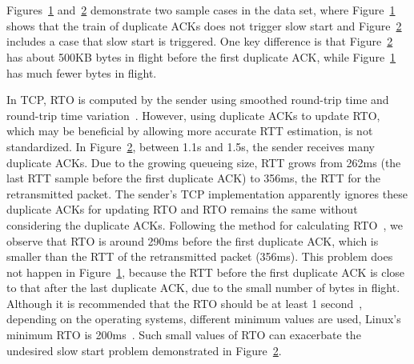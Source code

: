 \begin{figure}[t]
\centering
{}\\
\label{fig:seq.ack1}
\end{figure}

\begin{figure}[t]
\centering
{}\\
\label{fig:seq.ack2}
\end{figure}

Figures~\ref{fig:seq.ack1} and~\ref{fig:seq.ack2} demonstrate two sample cases in the data set, where Figure~\ref{fig:seq.ack1} shows that the train of duplicate ACKs does not trigger slow start and Figure~\ref{fig:seq.ack2} includes a case that slow start is triggered. One key difference is that Figure~\ref{fig:seq.ack2} has about 500KB bytes in flight before the first duplicate ACK, while Figure~\ref{fig:seq.ack1} has much fewer bytes in flight.

In TCP, RTO is computed by the sender using smoothed round-trip time and round-trip time variation~\cite{rfc6298}. However, using duplicate ACKs to update RTO, which may be beneficial by allowing more accurate RTT estimation, is not standardized. In Figure~\ref{fig:seq.ack2}, between 1.1s and 1.5s, the sender receives many duplicate ACKs. Due to the growing queueing size, RTT grows from 262ms (the last RTT sample before the first duplicate ACK) to 356ms, the RTT for the retransmitted packet. The sender's TCP implementation apparently ignores these duplicate ACKs for updating RTO and RTO remains the same without considering the duplicate ACKs. Following the method for calculating RTO~\cite{rfc6298}, we observe that RTO is around 290ms before the first duplicate ACK, which is smaller than the RTT of the retransmitted packet (356ms). This problem does not happen in Figure~\ref{fig:seq.ack1}, because the RTT before the first duplicate ACK is close to that after the last duplicate ACK, due to the small number of bytes in flight. Although it is recommended that the RTO should be at least 1 second~\cite{rfc6298}, depending on the operating systems, different minimum values are used, \eg Linux's minimum RTO is 200ms~\cite{linuxrto}. Such small values of RTO can exacerbate the undesired slow start problem demonstrated in Figure~\ref{fig:seq.ack2}.

